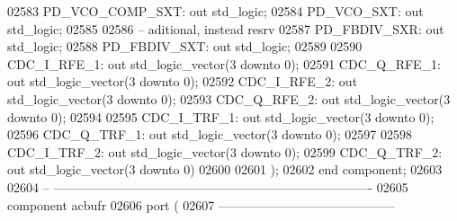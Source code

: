 \begin{DoxyCode}
02583     PD\_VCO\_COMP\_SXT:    \textcolor{keywordflow}{out} \textcolor{comment}{std\_logic};
02584     PD\_VCO\_SXT: \textcolor{keywordflow}{out} \textcolor{comment}{std\_logic};
02585     
02586 \textcolor{keyword}{    -- aditional, instead resrv}
02587     PD\_FBDIV\_SXR:   \textcolor{keywordflow}{out} \textcolor{comment}{std\_logic}; 
02588     PD\_FBDIV\_SXT:   \textcolor{keywordflow}{out} \textcolor{comment}{std\_logic};
02589 
02590     CDC\_I\_RFE\_1:    \textcolor{keywordflow}{out} \textcolor{comment}{std\_logic\_vector}(\textcolor{vhdllogic}{}\textcolor{vhdllogic}{3} \textcolor{keywordflow}{downto} \textcolor{vhdllogic}{}\textcolor{vhdllogic}{0});
02591     CDC\_Q\_RFE\_1:    \textcolor{keywordflow}{out} \textcolor{comment}{std\_logic\_vector}(\textcolor{vhdllogic}{}\textcolor{vhdllogic}{3} \textcolor{keywordflow}{downto} \textcolor{vhdllogic}{}\textcolor{vhdllogic}{0});
02592     CDC\_I\_RFE\_2:    \textcolor{keywordflow}{out} \textcolor{comment}{std\_logic\_vector}(\textcolor{vhdllogic}{}\textcolor{vhdllogic}{3} \textcolor{keywordflow}{downto} \textcolor{vhdllogic}{}\textcolor{vhdllogic}{0});
02593     CDC\_Q\_RFE\_2:    \textcolor{keywordflow}{out} \textcolor{comment}{std\_logic\_vector}(\textcolor{vhdllogic}{}\textcolor{vhdllogic}{3} \textcolor{keywordflow}{downto} \textcolor{vhdllogic}{}\textcolor{vhdllogic}{0});
02594 
02595     CDC\_I\_TRF\_1:    \textcolor{keywordflow}{out} \textcolor{comment}{std\_logic\_vector}(\textcolor{vhdllogic}{}\textcolor{vhdllogic}{3} \textcolor{keywordflow}{downto} \textcolor{vhdllogic}{}\textcolor{vhdllogic}{0});
02596     CDC\_Q\_TRF\_1:    \textcolor{keywordflow}{out} \textcolor{comment}{std\_logic\_vector}(\textcolor{vhdllogic}{}\textcolor{vhdllogic}{3} \textcolor{keywordflow}{downto} \textcolor{vhdllogic}{}\textcolor{vhdllogic}{0});
02597 
02598     CDC\_I\_TRF\_2:    \textcolor{keywordflow}{out} \textcolor{comment}{std\_logic\_vector}(\textcolor{vhdllogic}{}\textcolor{vhdllogic}{3} \textcolor{keywordflow}{downto} \textcolor{vhdllogic}{}\textcolor{vhdllogic}{0});
02599     CDC\_Q\_TRF\_2:    \textcolor{keywordflow}{out} \textcolor{comment}{std\_logic\_vector}(\textcolor{vhdllogic}{}\textcolor{vhdllogic}{3} \textcolor{keywordflow}{downto} \textcolor{vhdllogic}{}\textcolor{vhdllogic}{0})
02600 
02601     );
02602 \textcolor{keywordflow}{end} \textcolor{keywordflow}{component};
02603 
02604 \textcolor{keyword}{-- ----------------------------------------------------------------------------}
02605 \textcolor{keywordflow}{component} acbufr
02606     \textcolor{keywordflow}{port} (
02607 \textcolor{keyword}{    ------------------------------------------  }

\end{DoxyCode}
